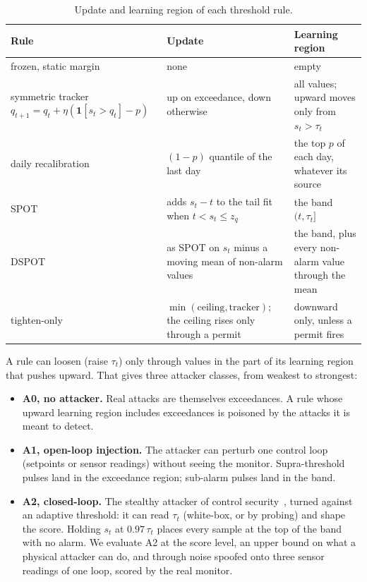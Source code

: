 \documentclass[sigconf,review,anonymous]{acmart}
\begin{document}
\begin{table}[t]
\caption{Update and learning region of each threshold rule.}
\label{tab:regions}
\begin{tabularx}{\textwidth}{@{}>{\hsize}L>{\hsize}L>{\hsize}L@{}}
\toprule
Rule & Update & Learning region \\
\midrule
frozen, static margin & none & empty \\
symmetric tracker $q_{t+1} = q_t + \eta(\mathbf{1}[s_t > q_t] - p)$ & up on exceedance, down otherwise & all values; upward moves only from $s_t > \tau_t$ \\
daily recalibration & $(1 - p)$ quantile of the last day & the top $p$ of each day, whatever its source \\
SPOT & adds $s_t - t$ to the tail fit when $t < s_t \le z_q$ & the band $(t, \tau_t]$ \\
DSPOT & as SPOT on $s_t$ minus a moving mean of non-alarm values & the band, plus every non-alarm value through the mean \\
tighten-only & $\min(\text{ceiling}, \text{tracker})$; the ceiling rises only through a permit & downward only, unless a permit fires \\
\bottomrule
\end{tabularx}
\end{table}

A rule can loosen (raise $\tau_t$) only through values in the part of its learning region that
pushes upward. That gives three attacker classes, from weakest to strongest:

\begin{itemize}
\item \textbf{A0, no attacker.} Real attacks are themselves exceedances. A rule whose upward
  learning region includes exceedances is poisoned by the attacks it is meant to detect.
\item \textbf{A1, open-loop injection.} The attacker can perturb one control loop (setpoints or
  sensor readings) without seeing the monitor. Supra-threshold pulses land in the exceedance
  region; sub-alarm pulses land in the band.
\item \textbf{A2, closed-loop.} The stealthy attacker of control
  security~\cite{cardenas2011process, urbina2016stealthy}, turned against an adaptive threshold: it can
  read $\tau_t$ (white-box, or by probing) and shape the score. Holding $s_t$ at $0.97\,\tau_t$ places
  every sample at the top of the band with no
  alarm. We evaluate A2 at the score level, an upper bound on what a physical attacker can do, and
  through noise spoofed onto three sensor readings of one loop, scored by the real monitor.
\end{itemize}
\end{document}
